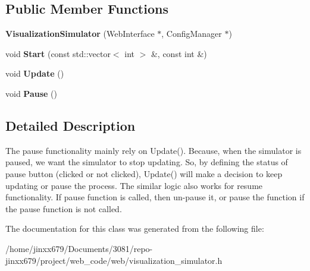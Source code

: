 \subsection*{Public Member Functions}
\begin{DoxyCompactItemize}
\item 
\mbox{\label{classVisualizationSimulator_a6081cd133454d886ed412f44ad9e8237}} 
{\bfseries Visualization\+Simulator} (Web\+Interface $\ast$, Config\+Manager $\ast$)
\item 
\mbox{\label{classVisualizationSimulator_abbf0bc7c2913dd690900578e17a4cdcb}} 
void {\bfseries Start} (const std\+::vector$<$ int $>$ \&, const int \&)
\item 
\mbox{\label{classVisualizationSimulator_a211b13dd71e679f58bd645089ae10319}} 
void {\bfseries Update} ()
\item 
\mbox{\label{classVisualizationSimulator_a7f0452e9e371a1bf2d8afb0873771da4}} 
void {\bfseries Pause} ()
\end{DoxyCompactItemize}


\subsection{Detailed Description}
The pause functionality mainly rely on Update(). Because, when the simulator is paused, we want the simulator to stop updating. So, by defining the status of pause button (clicked or not clicked), Update() will make a decision to keep updating or pause the process. The similar logic also works for resume functionality. If pause function is called, then un-\/pause it, or pause the function if the pause function is not called. 

The documentation for this class was generated from the following file\+:\begin{DoxyCompactItemize}
\item 
/home/jinxx679/\+Documents/3081/repo-\/jinxx679/project/web\+\_\+code/web/visualization\+\_\+simulator.\+h\end{DoxyCompactItemize}
